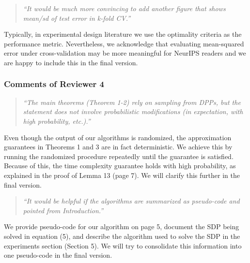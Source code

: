 \documentclass{article}
\begin{document}
\begin{quote}
\emph{``It would be much more convincing to add another figure that
  shows mean/sd of test error in k-fold CV.''}
\end{quote}
Typically, in experimental design literature we use the optimality
criteria as the performance metric. Nevertheless, we acknowledge that evaluating
mean-squared error under cross-validation may be more meaningful for NeurIPS
readers and we are happy to include this in the final version.%

\subsubsection*{Comments of Reviewer 4}
\begin{quote}
  \emph{``The main theorems (Theorem 1-2) rely on sampling from DPPs,
    but the statement does not involve probabilistic modifications (in
    expectation, with high probability, etc.).''}
\end{quote}
Even though the output of our algorithms is randomized, the
approximation guarantees in Theorems 1 and 3 are in fact
deterministic. We achieve this by running the randomized procedure
repeatedly until the guarantee is satisfied. Because of this, the time
complexity guarantee holds with high probability, as explained in the
proof of Lemma 13 (page 7). We will clarify this further in the final version.

\begin{quote}
  \emph{``It would be helpful if the algorithms are summarized as
  pseudo-code and pointed from Introduction.''}
\end{quote}
We provide pseudo-code for our algorithm on page 5, document the
SDP being solved in equation (5), and describe the algorithm used to solve
the SDP in the experiments section (Section 5). We will try to
consolidate this information into one pseudo-code in the final version.


\end{document}
